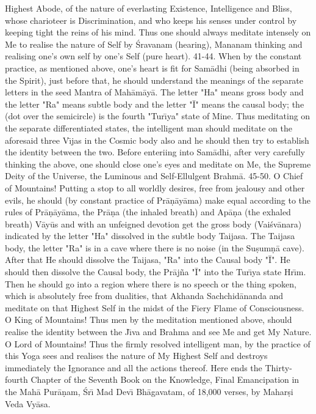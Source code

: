 Highest Abode, of the nature of everlasting Existence, Intelligence and Bliss, whose charioteer is Discrimination, and who keeps his senses under control by keeping tight the reins of his mind. Thus one should always meditate intensely on Me to realise the nature of Self by \'Sravanam (hearing), Mananam thinking and realising one's own self by one's Self (pure heart).
41-44. When by the constant practice, as mentioned above, one's heart is fit for Sam\=adhi (being absorbed in the Spirit), just before that, he should understand the meanings of the separate letters in the seed Mantra of Mah\=am\=ay\=a. The letter "Ha" means gross body and the letter "Ra" means subtle body and the letter "\=I" means the causal body; the (dot over the semicircle) is the fourth "Tur\={\i}ya" state of Mine. Thus meditating on the separate differentiated states, the intelligent man should meditate on the aforesaid three V\={\i}jas in the Cosmic body also and he should then try to establish the identity between the two. Before enteriing into Sam\=adhi, after very carefully thinking the above, one should close one's eyes and meditate on Me, the Supreme Deity of the Universe, the Luminous and Self-Ellulgent Brahm\=a.
45-50. O Chief of Mountains! Putting a stop to all worldly desires, free from jealousy and other evils, he should (by constant practice of Pr\=a\d{n}\=ay\=ama) make equal according to the rules of Pr\=a\d{n}\=ay\=ama, the Pr\=a\d{n}a (the inhaled breath) and Ap\=a\d{n}a (the exhaled breath) V\=ay\=us and with an unfeigned devotion get the gross body (Vai\'sv\=anara) indicated by the letter "Ha" dissolved in the subtle body Taijasa. The Taijasa body, the letter "Ra" is in a cave where there is no noise (in the Su\d{s}um\d{n}\=a cave). After that He should dissolve the Taijasa, "Ra" into the Causal body "\=I". He should then dissolve the Causal body, the Pr\=aj\~na "\=I" into the Tur\={\i}ya state Hr\={\i}m. Then he should go into a region where there is no speech or the thing spoken, which is absolutely free from dualities, that Akhanda Sachchid\=ananda and meditate on that Highest Self in the midst of the Fiery Flame of Consciousness. O King of Mountains! Thus men by the meditation mentioned above, should realise the identity between the J\={\i}va and Brahma and see Me and get My Nature. O Lord of Mountains! Thus the firmly resolved intelligent man, by the practice of this Yoga sees and realises the nature of My Highest Self and destroys immediately the Ignorance and all the actions thereof.
Here ends the Thirty-fourth Chapter of the Seventh Book on the Knowledge, Final Emancipation in the Mah\=a Pur\=a\d{n}am, \'Sr\={\i} Mad Dev\={\i} Bh\=agavatam, of 18,000 verses, by Mahar\d{s}i Veda Vy\=asa.



